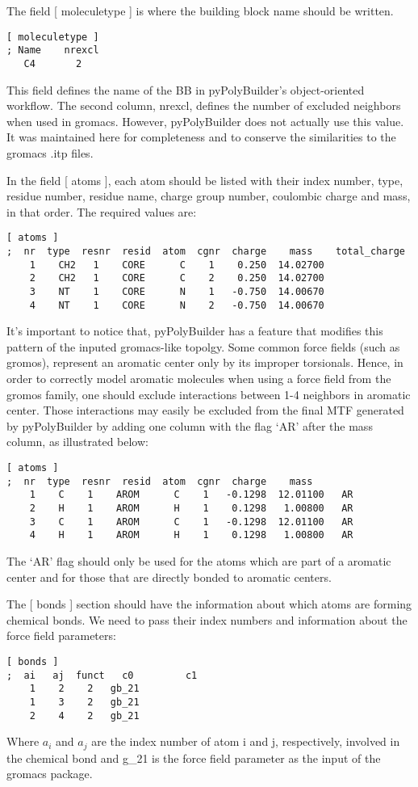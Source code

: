 \documentclass[12pt]{article}
\begin{document}
The field [ moleculetype ] is where the building block name should be written.
\begin{lstlisting}
[ moleculetype ]
; Name    nrexcl
   C4       2
\end{lstlisting}
This field defines the name of the BB in pyPolyBuilder's object-oriented workflow.
The second column, nrexcl, defines the number of excluded neighbors when used in gromacs. 
However, pyPolyBuilder does not actually use this value. It was maintained here for completeness and to conserve the similarities to the gromacs .itp files.

In the field [ atoms ], each atom should be listed with their index number, type, residue number, residue name, charge group number, coulombic charge and mass, in that order. The required values are:

\begin{lstlisting}
[ atoms ]
;  nr  type  resnr  resid  atom  cgnr  charge    mass    total_charge
    1    CH2   1    CORE      C    1    0.250  14.02700
    2    CH2   1    CORE      C    2    0.250  14.02700
    3    NT    1    CORE      N    1   -0.750  14.00670
    4    NT    1    CORE      N    2   -0.750  14.00670
\end{lstlisting}

It's important to notice that, pyPolyBuilder has a feature that modifies this pattern of the inputed gromacs-like topolgy.
Some common force fields (such as gromos), represent an aromatic center only by its improper torsionals.
Hence, in order to correctly model aromatic molecules when using a force field from the gromos family, one should exclude interactions between 1-4 neighbors in aromatic center.
Those interactions may easily be excluded from the final MTF generated by pyPolyBuilder by adding one column with the flag `AR' after the mass column, as illustrated below:

\begin{lstlisting}
[ atoms ]
;  nr  type  resnr  resid  atom  cgnr  charge    mass    
    1    C    1    AROM      C    1   -0.1298  12.01100   AR
    2    H    1    AROM      H    1    0.1298   1.00800   AR
    3    C    1    AROM      C    1   -0.1298  12.01100   AR
    4    H    1    AROM      H    1    0.1298   1.00800   AR
\end{lstlisting}

The `AR' flag should only be used for the atoms which are part of a aromatic center and for those that are directly bonded to aromatic centers.

The [ bonds ] section should have the information about which atoms are forming
chemical bonds. We need to pass their index numbers and information about
the force field parameters:
\begin{lstlisting}
[ bonds ]
;  ai   aj  funct   c0         c1
    1    2    2   gb_21
    1    3    2   gb_21
    2    4    2   gb_21
\end{lstlisting}
Where $a_i$ and $a_j$ are the index number of atom i and j, respectively, involved in the chemical bond and g\_21 is the force field parameter as the input of the gromacs package.
\end{document}
